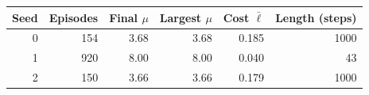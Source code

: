 \begin{tabular}{rrrrrr}\toprule
Seed & Episodes & Final $\mu$ & Largest $\mu$ & Cost $\bar\ell$ & Length (steps) \\\midrule
0 & 154 & 3.68 & 3.68 & 0.185 & 1000 \\
1 & 920 & 8.00 & 8.00 & 0.040 & 43 \\
2 & 150 & 3.66 & 3.66 & 0.179 & 1000 \\
\bottomrule\end{tabular}
